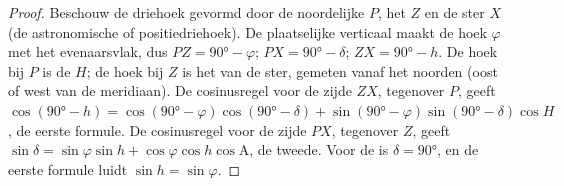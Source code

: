 \begin{proof}
Beschouw de driehoek gevormd door de noordelijke  $P$, het  $Z$
en de ster $X$ (de astronomische of positiedriehoek). De plaatselijke verticaal
maakt de hoek $\varphi$ met het evenaarsvlak, dus $PZ =
\ang{90} - \varphi$;
$PX = \ang{90} - \delta$; $ZX = \ang{90} - h$. De hoek bij $P$ is de 
$H$; de hoek bij $Z$ is het  van de ster, gemeten vanaf het noorden (oost
of west van de meridiaan). De cosinusregel voor de zijde $ZX$, tegenover $P$,
geeft $\cos(\ang{90} - h) = \cos(\ang{90} - \varphi)\cos(\ang{90} - \delta) +
\sin(\ang{90} - \varphi)\sin(\ang{90} - \delta)\cos H$, de eerste formule. De
cosinusregel voor de zijde $PX$, tegenover $Z$, geeft
$\sin\delta = \sin\varphi\sin h + \cos\varphi\cos h\cos\mathrm{A}$, de tweede.
Voor de  is $\delta = \ang{90}$, en de eerste formule luidt
$\sin h = \sin\varphi$.
\end{proof}

